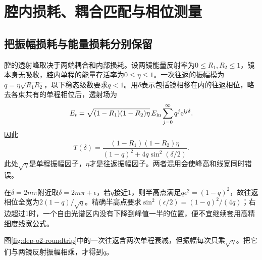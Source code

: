 \section{腔内损耗、耦合匹配与相位测量}
\subsection{把振幅损耗与能量损耗分别保留}
腔的透射峰取决于两端耦合和内部损耗。设两镜能量反射率为$0\leq R_1,R_2\leq1$，镜本身无吸收，腔内单程的能量存活率为$0\leq\eta\leq1$。一次往返的振幅模为$q=\eta\sqrt{R_1R_2}$，以下稳态级数要求$q<1$。用$\delta$表示包括镜相移在内的往返相位，略去各束共有的单程相位后，透射场为
\[
 E_t=\sqrt{(1-R_1)(1-R_2)\eta}\,E_{
 \rm in}\sum_{j=0}^{\infty}q^j\mathrm e^{\mathrm i j\delta}.
\]
因此
\[
 T(\delta)=\frac{(1-R_1)(1-R_2)\eta}
 {(1-q)^2+4q\sin^2(\delta/2)}.
\]
此处$\sqrt\eta$是单程振幅因子，$\eta$才是往返振幅因子。两者混用会使峰高和线宽同时错误。

在$\delta=2m\pi$附近取$\delta=2m\pi+\epsilon$，若$q$接近1，则半高点满足$q\epsilon^2=(1-q)^2$，故往返相位全宽为$2(1-q)/\sqrt q$。精确半高点要求$\sin^2(\epsilon/2)=(1-q)^2/(4q)$；右边超过1时，一个自由光谱区内没有下降到峰值一半的位置，便不宜继续套用高精细度线宽公式。

图\ref{fig:dep-o2-roundtrip}中的一次往返含两次单程衰减，但振幅每次只乘$\sqrt\eta$。把它们与两镜反射振幅相乘，才得到$q$。

